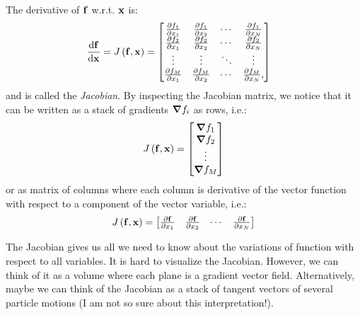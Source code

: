 \documentclass[12pt,letter]{article}
\begin{document}
The derivative of ${\bf f}$ w.r.t. ${\bf x}$ is: 
\begin{align}
          \dv{\bf f}{\bf x}  &= J\left({\bf f},{\bf x}\right) = 
          \begin{bmatrix}
          	 \pdv{f_1}{x_1} &  \pdv{f_1}{x_2} &  \cdots &  \pdv{f_1}{x_N} \\
          	 \pdv{f_2}{x_1} &  \pdv{f_2}{x_2} &  \cdots &  \pdv{f_2}{x_N} \\
          	 \vdots &  \vdots &  \ddots &  \vdots \\
          	 \pdv{f_M}{x_1} &  \pdv{f_M}{x_2} &  \cdots &  \pdv{f_M}{x_N},  \\
          \end{bmatrix}
	\label{jacobian}
\end{align}
and is called the {\em Jacobian}. By inspecting the Jacobian matrix, we notice that it can be written as a stack of gradients $\grad f_i$ as rows, i.e.: 
\begin{align}
           J\left({\bf f},{\bf x}\right) = 
          \begin{bmatrix}
          	 \grad f_1  \\
          	 \grad f_2  \\
          	 \vdots  \\
          	 \grad f_M  \\
          \end{bmatrix}
	\label{jacobian2}
\end{align}
or as matrix of columns where each column is derivative of the vector function with respect to a component of the vector variable, i.e.: 
\begin{align}
           J\left({\bf f},{\bf x}\right) = 
          \begin{bmatrix}
          	 \pdv{{\bf f}}{x_1}  & \pdv{{\bf f}}{x_2} & \cdots & \pdv{{\bf f}}{x_N}
          \end{bmatrix}
	\label{jacobian3}
\end{align}

The Jacobian gives us all we need to know about the variations of function with respect to all variables. It is hard to visualize the Jacobian. However, we can think of it as a volume where each plane is a gradient vector field. Alternatively, maybe we can think of the Jacobian as a stack of tangent vectors of several particle motions (I am not so sure about this interpretation!).  








 

\end{document}
